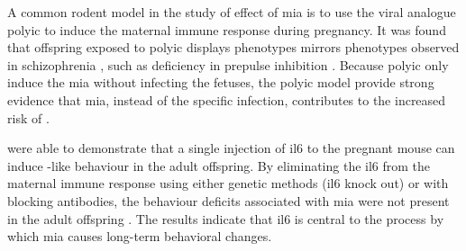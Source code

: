 	A common rodent model in the study of effect of \gls{mia} is to use the viral analogue \gls{polyic} to induce the maternal immune response during pregnancy.
	It was found that offspring exposed to \gls{polyic} displays phenotypes mirrors phenotypes observed in schizophrenia \citep{Li2009c,Meyer2009b,Li2010a}, such as deficiency in prepulse inhibition \citep{Cadenhead2000}.
	Because \gls{polyic} only induce the \gls{mia} without infecting the fetuses, the \gls{polyic} model provide strong evidence that \gls{mia}, instead of the specific infection, contributes to the increased risk of .	
	
	\citet{Smith2007} were able to demonstrate that a single injection of \gls{il6} to the pregnant mouse can induce -like behaviour in the adult offspring. 
	By eliminating the \gls{il6} from the maternal immune response using either genetic methods (\gls{il6} knock out) or with blocking antibodies, the behaviour deficits associated with \gls{mia} were not present in the adult offspring \citep{Smith2007}.
	The results indicate that \gls{il6} is central to the process by which \gls{mia} causes long-term behavioral changes.
	
